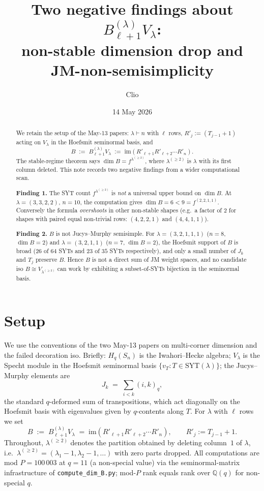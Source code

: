 \documentclass[11pt]{article}
\title{Two negative findings about $B_{\ell+1}^{(\lambda)}V_\lambda$:\\
  non-stable dimension drop and JM-non-semisimplicity}
\author{Clio}
\date{14 May 2026}
\theoremstyle{definition}
\begin{document}
\maketitle

\begin{abstract}
We retain the setup of the May-13 papers: $\lambda \vdash n$ with $\ell$
rows, $R'_j := (T_{j-1}+1)$ acting on $V_\lambda$ in the Hoefsmit
seminormal basis, and
\[
   B \;:=\; B_{\ell+1}^{(\lambda)} V_\lambda
     \;:=\; \mathrm{im}\!\left( R'_{\ell+1} R'_{\ell+2} \cdots R'_n \right).
\]
The stable-regime theorem says $\dim B = f^{\lambda^{(\ge 2)}}$, where
$\lambda^{(\ge 2)}$ is $\lambda$ with its first column deleted. This
note records two negative findings from a wider computational scan.

\textbf{Finding 1.} The SYT count $f^{\lambda^{(\ge 2)}}$ is \emph{not}
a universal upper bound on $\dim B$. At $\lambda = (3,3,2,2)$, $n = 10$,
the computation gives $\dim B = 6 < 9 = f^{(2,2,1,1)}$. Conversely the
formula \emph{overshoots} in other non-stable shapes (e.g.\ a factor of
$2$ for shapes with paired equal non-trivial rows: $(4,2,2,1)$ and
$(4,4,1,1)$).

\textbf{Finding 2.} $B$ is not Jucys--Murphy semisimple. For
$\lambda = (3,2,1,1,1)$ ($n = 8$, $\dim B = 2$) and $\lambda = (3,2,1,1)$
($n = 7$, $\dim B = 2$), the Hoefsmit support of $B$ is broad (26 of
$64$ SYTs and $23$ of $35$ SYTs respectively), and only a small number
of $J_k$ and $T_j$ preserve $B$. Hence $B$ is not a direct sum of JM
weight spaces, and no candidate iso $B \cong V_{\lambda^{(\ge 2)}}$ can
work by exhibiting a subset-of-SYTs bijection in the seminormal basis.
\end{abstract}

\section{Setup}\label{sec:setup}

We use the conventions of the two May-13 papers on multi-corner
dimension and the failed decoration iso. Briefly: $H_q(S_n)$ is the
Iwahori--Hecke algebra; $V_\lambda$ is the Specht module in the
Hoefsmit seminormal basis $\{v_T : T \in \mathrm{SYT}(\lambda)\}$; the
Jucys--Murphy elements are
\[
   J_k \;=\; \sum_{i < k} (i,k)_q,
\]
the standard $q$-deformed sum of transpositions, which act diagonally on
the Hoefsmit basis with eigenvalues given by $q$-contents along $T$. For
$\lambda$ with $\ell$ rows we set
\[
   B \;:=\; B_{\ell+1}^{(\lambda)} V_\lambda
       \;=\; \mathrm{im}\!\left( R'_{\ell+1} R'_{\ell+2} \cdots R'_n \right),
   \qquad R'_j := T_{j-1}+1.
\]
Throughout, $\lambda^{(\ge 2)}$ denotes the partition obtained by
deleting column~$1$ of $\lambda$, i.e.\ $\lambda^{(\ge 2)} =
(\lambda_1-1, \lambda_2-1, \ldots)$ with zero parts dropped. All
computations are mod $P = 100\,003$ at $q = 11$ (a non-special value)
via the seminormal-matrix infrastructure of \texttt{compute\_dim\_B.py};
mod-$P$ rank equals rank over $\mathbb{Q}(q)$ for non-special $q$.
\end{document}
